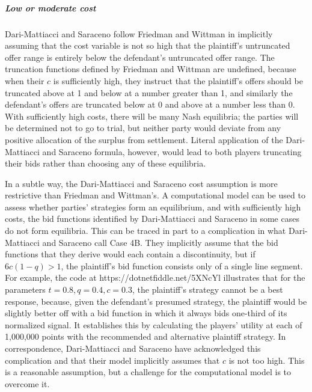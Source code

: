 \documentclass{article}
\begin{document}
\subparagraph{Low or moderate cost}Dari-Mattiacci and Saraceno follow Friedman and Wittman in implicitly assuming that the cost variable is not so high that the plaintiff's untruncated offer range is entirely below the defendant's untruncated offer range. The truncation functions defined by Friedman and Wittman are undefined, because when their $c$ is sufficiently high, they instruct that the plaintiff's offers should be truncated above at 1 and below at a number greater than 1, and similarly the defendant's offers are truncated below at 0 and above at a number less than 0. With sufficiently high costs, there will be many Nash equilibria; the parties will be determined not to go to trial, but neither party would deviate from any positive allocation of the surplus from settlement. Literal application of the Dari-Mattiacci and Saraceno formula, however, would lead to both players truncating their bids rather than choosing any of these equilibria.

In a subtle way, the Dari-Mattiacci and Saraceno cost assumption is more restrictive than Friedman and Wittman's. A computational model can be used to assess whether parties' strategies form an equilibrium, and with sufficiently high costs, the bid functions identified by Dari-Mattiacci and Saraceno in some cases do not form equilibria. This can be traced in part to a complication in what Dari-Mattiacci and Saraceno call Case 4B. They implicitly assume that the bid functions that they derive would each contain a discontinuity, but if $6c(1-q) > 1$, the plaintiff's bid function consists only of a single line segment. For example, the code at https://dotnetfiddle.net/5XNcYl illustrates that for the parameters $t = 0.8, q = 0.4, c = 0.3$, the plaintiff's strategy cannot be a best response, because, given the defendant's presumed strategy, the plaintiff would be slightly better off with a bid function in which it always bids one-third of its normalized signal. It establishes this by calculating the players' utility at each of 1,000,000 points with the recommended and alternative plaintiff strategy. In correspondence, Dari-Mattiacci and Saraceno have acknowledged this complication and that their model implicitly assumes that $c$ is not too high. This is a reasonable assumption, but a challenge for the computational model is to overcome it.
\end{document}
